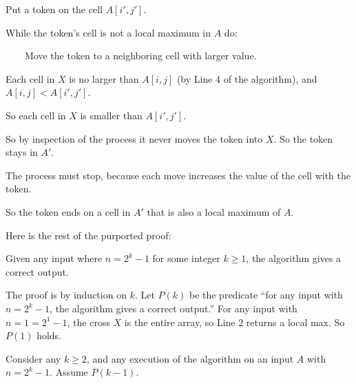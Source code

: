 \documentclass[11pt]{article}
\begin{document}
{\begin{longFormProof}
    \begin{myframed}
      \begin{steps}
      \item[~(i)] Put a token on the cell $A[i', j']$.

      \item[\,(ii)] While the token's cell is not a local maximum in $A$ do:

      \item[(iii)]~~~~Move the token to a neighboring cell with larger value.
      \end{steps}
    \end{myframed}

    \step Each cell in $X$ is no larger than $A[i,j]$ (by Line 4 of the algorithm), and $A[i, j] < A[i',j']$.

    \step So each cell in $X$ is smaller than $A[i', j']$.

    \step So by inspection of the process it never moves the token into $X$.  So the token stays in $A'$.

    \step The process must stop, because each move increases the value of the cell with the token.

    \step So the token ends on a cell in $A'$ that is also a local maximum of $A$.
  \end{longFormProof}

  Here is the rest of the purported proof:

  \begin{lemma}\label{lemma: local max}
    Given any input where $n=2^k-1$ for some integer $k\ge 1$,
    the algorithm gives a correct output.
  \end{lemma}
  \begin{longFormProof}
    \step The proof is by induction on $k$.
    \step Let $P(k)$ be the predicate ``for any input with $n=2^k-1$, the algorithm gives a correct output.''
    \step For any input with $n=1=2^1-1$, the cross $X$ is the entire array, so Line 2 returns a local max.
    \step So $P(1)$ holds.

    \begin{block}
      \step\label{step: ind} Consider any $k\ge 2$, 
      and any execution of the algorithm on an input $A$ with $n=2^k-1$.
      Assume $P(k-1)$.


\end{block}
\end{longFormProof}}
\end{document}
